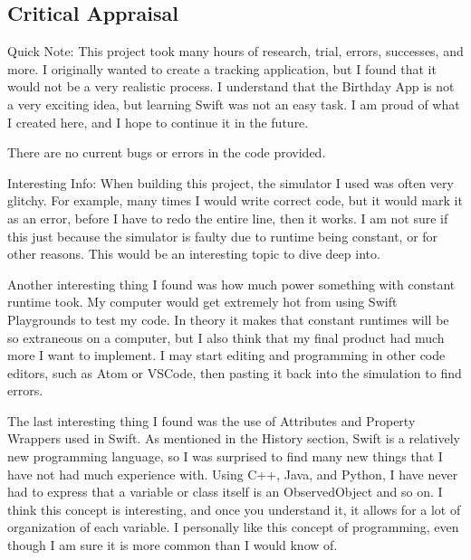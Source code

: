 \documentclass{article}
\theoremstyle{theorem}
\theoremstyle{definition}
\theoremstyle{remark}
\begin{document}
\subsection{Critical Appraisal}
Quick Note: This project took many hours of research, trial, errors, successes, and more. I originally wanted to create a tracking application, but I found that it would not be a very realistic process. I understand that the Birthday App is not a very exciting idea, but learning Swift was not an easy task. I am proud of what I created here, and I hope to continue it in the future. 

\noindent\newline There are no current bugs or errors in the code provided. 

\noindent\newline Interesting Info:
\noindent\newline When building this project, the simulator I used was often very glitchy. For example, many times I would write correct code, but it would mark it as an error, before I have to redo the entire line, then it works. I am not sure if this just because the simulator is faulty due to runtime being constant, or for other reasons. This would be an interesting topic to dive deep into.

\noindent\newline Another interesting thing I found was how much power something with constant runtime took. My computer would get extremely hot from using Swift Playgrounds to test my code. In theory it makes that constant runtimes will be so extraneous on a computer, but I also think that my final product had much more I want to implement. I may start editing and programming in other code editors, such as Atom or VSCode, then pasting it back into the simulation to find errors.

\noindent\newline The last interesting thing I found was the use of Attributes and Property Wrappers used in Swift. As mentioned in the History section, Swift is a relatively new programming language, so I was surprised to find many new things that I have not had much experience with. Using C++, Java, and Python, I have never had to express that a variable or class itself is an ObservedObject and so on. I think this concept is interesting, and once you understand it, it allows for a lot of organization of each variable. I personally like this concept of programming, even though I am sure it is more common than I would know of.  
\end{document}
